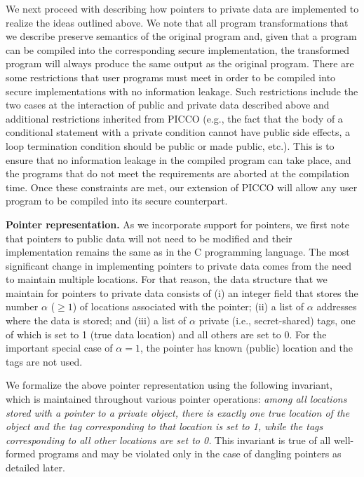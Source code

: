 \documentclass[11pt]{article}
\begin{document}
We next proceed with describing how pointers to private data are
implemented to realize the ideas outlined above. We note that all
program transformations that we describe preserve semantics of the
original program and, given that a program can be compiled into the
corresponding secure implementation, the transformed program will
always produce the same output as the original program. There are some
restrictions that user programs must meet in order to be compiled into
secure implementations with no information leakage. Such restrictions
include the two cases at the interaction of public and private data
described above and additional restrictions inherited from PICCO
(e.g., the fact that the body of a conditional statement with a
private condition cannot have public side effects, a loop termination
condition should be public or made public, etc.). This is to ensure
that no information leakage in the compiled program can take place,
and the programs that do not meet the requirements are aborted at the
compilation time. Once these constraints are met, our extension of
PICCO will allow any user program to be compiled into its secure
counterpart.

\medskip \noindent \textbf{Pointer representation.}
As we incorporate support for pointers, we first note that pointers to
public data will not need to be modified and their implementation remains
the same as in the C programming language. The most significant change in
implementing pointers to private data comes from the need to maintain
multiple locations. For that reason, the data structure that we maintain
for pointers to private data consists of (i) an integer field that stores
the number $\alpha$ ($\ge 1$) of locations associated with the pointer; (ii)
a list of $\alpha$ addresses where the data is stored; and (iii) a list of
$\alpha$ private (i.e., secret-shared) tags, one of which is set to 1 (true
data location) and all others are set to 0. For the important special case of
$\alpha=1$, the pointer has known (public) location and the tags are not
used. 

We formalize the above pointer representation using the following invariant,
which is maintained throughout various pointer operations: \emph{among all
locations stored with a pointer to a private object, there is exactly one
true location of the object and the tag corresponding to that location is
set to 1, while the tags corresponding to all other locations are set to 0.}
This invariant is true of all well-formed programs and may be violated only
in the case of dangling pointers as detailed later.
\end{document}
